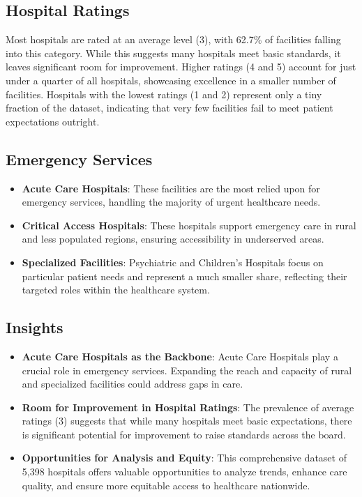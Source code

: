 \subsection{Hospital Ratings}
Most hospitals are rated at an average level (3), with 62.7\% of facilities falling into this category. While this suggests many hospitals meet basic standards, it leaves significant room for improvement. Higher ratings (4 and 5) account for just under a quarter of all hospitals, showcasing excellence in a smaller number of facilities. Hospitals with the lowest ratings (1 and 2) represent only a tiny fraction of the dataset, indicating that very few facilities fail to meet patient expectations outright.

\subsection{Emergency Services}
\begin{itemize}
    \item \textbf{Acute Care Hospitals}: These facilities are the most relied upon for emergency services, handling the majority of urgent healthcare needs.
    \item \textbf{Critical Access Hospitals}: These hospitals support emergency care in rural and less populated regions, ensuring accessibility in underserved areas.
    \item \textbf{Specialized Facilities}: Psychiatric and Children’s Hospitals focus on particular patient needs and represent a much smaller share, reflecting their targeted roles within the healthcare system.
\end{itemize}

\subsection{Insights}
\begin{itemize}
    \item \textbf{Acute Care Hospitals as the Backbone}: Acute Care Hospitals play a crucial role in emergency services. Expanding the reach and capacity of rural and specialized facilities could address gaps in care.
    \item \textbf{Room for Improvement in Hospital Ratings}: The prevalence of average ratings (3) suggests that while many hospitals meet basic expectations, there is significant potential for improvement to raise standards across the board.
    \item \textbf{Opportunities for Analysis and Equity}: This comprehensive dataset of 5,398 hospitals offers valuable opportunities to analyze trends, enhance care quality, and ensure more equitable access to healthcare nationwide.
\end{itemize}

